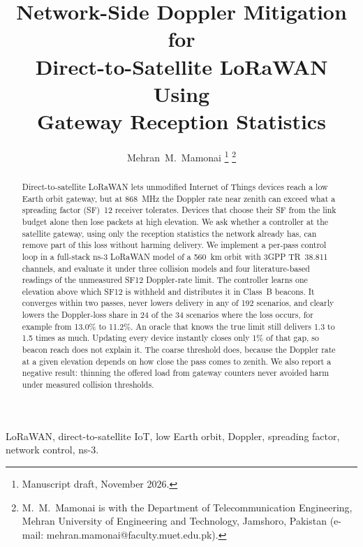 \documentclass[journal]{IEEEtran}
\begin{document}
\title{Network-Side Doppler Mitigation for\\ Direct-to-Satellite LoRaWAN Using\\ Gateway Reception Statistics}

\author{Mehran~M.~Mamonai%
\thanks{Manuscript draft, November 2026.}%
\thanks{M.~M.~Mamonai is with the Department of Telecommunication Engineering, Mehran University of Engineering and Technology, Jamshoro, Pakistan (e-mail: mehran.mamonai@faculty.muet.edu.pk).}}


\maketitle

\begin{abstract}
Direct-to-satellite LoRaWAN lets unmodified Internet of Things devices reach a low Earth orbit gateway, but at 868~MHz the Doppler rate near zenith can exceed what a spreading factor (SF)~12 receiver tolerates. Devices that choose their SF from the link budget alone then lose packets at high elevation. We ask whether a controller at the satellite gateway, using only the reception statistics the network already has, can remove part of this loss without harming delivery. We implement a per-pass control loop in a full-stack ns-3 LoRaWAN model of a 560~km orbit with 3GPP TR~38.811 channels, and evaluate it under three collision models and four literature-based readings of the unmeasured SF12 Doppler-rate limit. The controller learns one elevation above which SF12 is withheld and distributes it in Class~B beacons. It converges within two passes, never lowers delivery in any of 192 scenarios, and clearly lowers the Doppler-loss share in 24 of the 34 scenarios where the loss occurs, for example from 13.0\% to 11.2\%. An oracle that knows the true limit still delivers 1.3 to 1.5 times as much. Updating every device instantly closes only 1\% of that gap, so beacon reach does not explain it. The coarse threshold does, because the Doppler rate at a given elevation depends on how close the pass comes to zenith. We also report a negative result: thinning the offered load from gateway counters never avoided harm under measured collision thresholds.
\end{abstract}

\begin{IEEEkeywords}
LoRaWAN, direct-to-satellite IoT, low Earth orbit, Doppler, spreading factor, network control, ns-3.
\end{IEEEkeywords}
\end{document}
